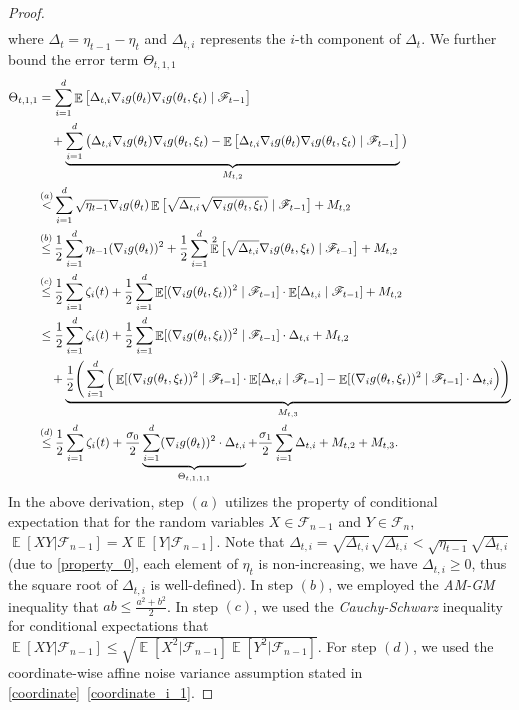 \documentclass[standalone]{article}
\DeclareMathOperator{\Expect}{\mathbb{E}}
\begin{document}
\begin{proof}
\begin{align}
\end{align}
where $\Delta_{t} = \eta_{t-1} - \eta_t$ and $\Delta_{t,i}$ represents the $i$-th component of $\Delta_{t}$. We further bound the error term $\Theta_{t,1,1}$
\begin{align}\label{adam_2}
\Theta_{t,1,1} &=\sum_{i=1}^{d}\Expect\big[\Delta_{t,i}\nabla_{i}g(\theta_{t})\nabla_{i}g(\theta_{t},\xi_{t})\mid\mathscr{F}_{t-1}\big] \notag \\
& \quad +\underbrace{\sum_{i=1}^{d}\big(\Delta_{t,i}\nabla_{i}g(\theta_{t})\nabla_{i}g(\theta_{t},\xi_{t})-\Expect\big[\Delta_{t,i}\nabla_{i}g(\theta_{t})\nabla_{i}g(\theta_{t},\xi_{t})\mid\mathscr{F}_{t-1}\big]}_{M_{t,2}}\big)\notag\\&\mathop{<}^{(a)}\sum_{i=1}^{d}\sqrt{\eta_{{t-1}}}\nabla_{i}g(\theta_{t})\Expect\big[\sqrt{\Delta_{t,i}}\sqrt{\nabla_{i}g(\theta_{t},\xi_{t})}\mid\mathscr{F}_{t-1}\big]+M_{t,2}\notag\\&\mathop{\le}^{(b)} \frac{1}{2}\sum_{i=1}^{d}\eta_{{t-1}}(\nabla_{i} g(\theta_{t}))^{2}+\frac{1}{2}\sum_{i=1}^{d}\Expect^{2}\big[\sqrt{\Delta_{t,i}}{\nabla_{i}g(\theta_{t},\xi_{t})}\mid\mathscr{F}_{t-1}\big]+M_{t,2}\notag\\&\mathop{\le}^{(c)} \frac{1}{2}\sum_{i=1}^{d}\zeta_{i}(t)+\frac{1}{2}\sum_{i=1}^{d}\Expect[(\nabla_{i}g(\theta_{t},\xi_{t}))^{2}\mid\mathscr{F}_{t-1}]\cdot\Expect[\Delta_{t,i}\mid\mathscr{F}_{t-1}]+M_{t,2}\notag\\&\le \frac{1}{2}\sum_{i=1}^{d}\zeta_{i}(t)+\frac{1}{2}\sum_{i=1}^{d}\Expect[(\nabla_{i}g(\theta_{t},\xi_{t}))^{2}\mid\mathscr{F}_{t-1}]\cdot\Delta_{t,i} +M_{t,2}\notag\\&\quad +\underbrace{\frac{1}{2}\Bigg(\sum_{i=1}^{d}\Big(\Expect[(\nabla_{i}g(\theta_{t},\xi_{t}))^{2}\mid\mathscr{F}_{t-1}]\cdot\Expect[\Delta_{t,i}\mid\mathscr{F}_{t-1}]-\Expect[(\nabla_{i}g(\theta_{t},\xi_{t}))^{2}\mid\mathscr{F}_{t-1}]\cdot\Delta_{t,i}\Big)\Bigg)}_{M_{t,3}} \notag\\&\mathop{\le}^{(d)} \frac{1}{2}\sum_{i=1}^{d}\zeta_{i}(t)+\frac{\sigma_{0}}{2}\underbrace{\sum_{i=1}^{d}(\nabla_{i}g(\theta_{t}))^{2}\cdot\Delta_{t,i}}_{\Theta_{t,1,1,1}}+\frac{\sigma_{1}}{2}\sum_{i=1}^{d}\Delta_{t,i}+M_{t,2}+M_{t,3}.
\end{align}
In the above derivation, step $(a)$ utilizes the property of conditional expectation that for the random variables \(X \in \mathscr{F}_{n-1}\) and \(Y \in \mathscr{F}_{n}\), \(\Expect[XY|\mathscr{F}_{n-1}] = X\Expect[Y|\mathscr{F}_{n-1}]\). Note that \(\Delta_{t,i} = \sqrt{\Delta_{t,i}}\sqrt{\Delta_{t,i}} < \sqrt{\eta_{{t-1}}}\sqrt{\Delta_{t,i}}\) (due to  \cref{property_0}, each element of $\eta_t$ is non-increasing, we have \(\Delta_{t,i} \ge 0\), thus the square root of $\Delta_{t,i}$ is well-defined). In step $(b)$, we employed the \emph{AM-GM} inequality that \(ab \le \frac{a^{2} + b^{2}}{2}\). In step $(c)$, we used the \emph{Cauchy-Schwarz} inequality for conditional expectations that \(\Expect[XY|\mathscr{F}_{n-1}] \le \sqrt{\Expect[X^{2}|\mathscr{F}_{n-1}]\Expect[Y^{2}|\mathscr{F}_{n-1}]}.\) For step $(d)$, we used the coordinate-wise affine noise variance assumption stated in \cref{coordinate}~\ref{coordinate_i_1}.

\end{proof}
\end{document}
